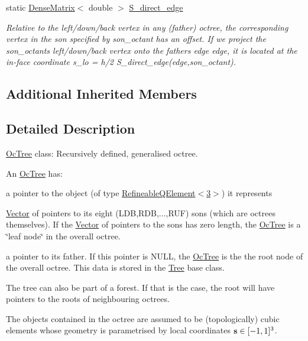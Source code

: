 \begin{DoxyCompactItemize}
static \hyperlink{classoomph_1_1DenseMatrix}{Dense\+Matrix}$<$ double $>$ \hyperlink{classoomph_1_1OcTree_abf12711759332ae1d0b55da939b62aa0}{S\+\_\+direct\+\_\+edge}
\begin{DoxyCompactList}\small\item\em Relative to the left/down/back vertex in any (father) octree, the corresponding vertex in the son specified by {\ttfamily son\+\_\+octant} has an offset. If we project the son\+\_\+octant\textquotesingle{}s left/down/back vertex onto the father\textquotesingle{}s edge {\ttfamily edge}, it is located at the in-\/face coordinate {\ttfamily s\+\_\+lo} = h/2 {\ttfamily S\+\_\+direct\+\_\+edge(edge,son\+\_\+octant)}. \end{DoxyCompactList}\end{DoxyCompactItemize}
\subsection*{Additional Inherited Members}


\subsection{Detailed Description}
\hyperlink{classoomph_1_1OcTree}{Oc\+Tree} class\+: Recursively defined, generalised octree.

An \hyperlink{classoomph_1_1OcTree}{Oc\+Tree} has\+:
\begin{DoxyItemize}
\item a pointer to the object (of type \hyperlink{classoomph_1_1RefineableQElement_3_013_01_4}{Refineable\+Q\+Element$<$3$>$}) it represents
\item \hyperlink{classoomph_1_1Vector}{Vector} of pointers to its eight (L\+DB,R\+DB,...,R\+UF) sons (which are octrees themselves). If the \hyperlink{classoomph_1_1Vector}{Vector} of pointers to the sons has zero length, the \hyperlink{classoomph_1_1OcTree}{Oc\+Tree} is a \char`\"{}leaf node\char`\"{} in the overall octree.
\item a pointer to its father. If this pointer is N\+U\+LL, the \hyperlink{classoomph_1_1OcTree}{Oc\+Tree} is the the root node of the overall octree. This data is stored in the \hyperlink{classoomph_1_1Tree}{Tree} base class.
\end{DoxyItemize}

The tree can also be part of a forest. If that is the case, the root will have pointers to the roots of neighbouring octrees.

The objects contained in the octree are assumed to be (topologically) cubic elements whose geometry is parametrised by local coordinates $ {\bf s} \in [-1,1]^3 $.

